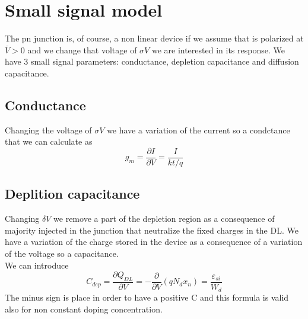 \section{Small signal model}
The pn junction is, of course, a non linear device if we assume that is polarized at $\overline{V}>0$ and we change that voltage of $\sigma V$ we are interested in its response. We have 3 small signal parameters: conductance, depletion capacitance and diffusion capacitance.
\subsection{Conductance}
Changing the voltage of $\sigma V$ we have a variation of the current so a condctance that we can calculate as 
\begin{equation}
g_m=\frac{\partial I}{\partial V}=\frac{I}{kt/q}
\end{equation}
\subsection{Deplition capacitance}
Changing $\delta V$ we remove a part of the depletion region as a consequence of majority injected in the junction that neutralize the fixed charges in the DL. We have a variation of the charge stored in the device as a consequence of a variation of the voltage so a capacitance.\\
We can introduce 
\begin{equation}
C_{dep}=\frac{\partial Q_{DL}}{\partial V}=-\frac{\partial }{\partial V}(qN_dx_n)=\frac{\varepsilon_{si}}{W_d}
\end{equation}
The minus sign is place in order to have a positive C and this formula is valid also for non constant doping concentration.\\
